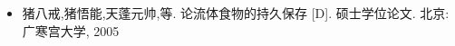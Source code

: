 \begin{publications}
\begin{itemize}
\item 猪八戒,猪悟能,天蓬元帅,等. 论流体食物的持久保存 [D]. 硕士学位论文. 北京: 广寒宫大学, 2005
\end{itemize}

\end{publications}

